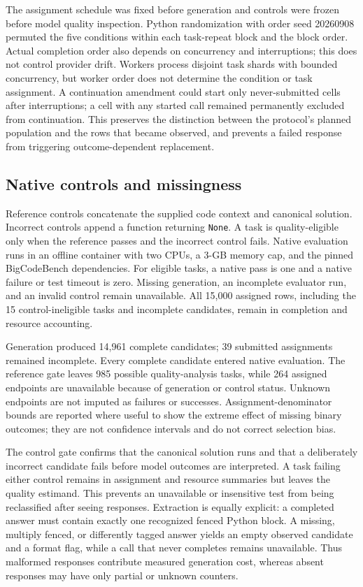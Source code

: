 The assignment schedule was fixed before generation and controls were frozen before model quality inspection. Python randomization with order seed 20260908 permuted the five conditions within each task-repeat block and the block order. Actual completion order also depends on concurrency and interruptions; this does not control provider drift. Workers process disjoint task shards with bounded concurrency, but worker order does not determine the condition or task assignment. A continuation amendment could start only never-submitted cells after interruptions; a cell with any started call remained permanently excluded from continuation. This preserves the distinction between the protocol's planned population and the rows that became observed, and prevents a failed response from triggering outcome-dependent replacement.

\subsection{Native controls and missingness}
Reference controls concatenate the supplied code context and canonical solution. Incorrect controls append a function returning \texttt{None}. A task is quality-eligible only when the reference passes and the incorrect control fails. Native evaluation runs in an offline container with two CPUs, a 3-GB memory cap, and the pinned BigCodeBench dependencies. For eligible tasks, a native pass is one and a native failure or test timeout is zero. Missing generation, an incomplete evaluator run, and an invalid control remain unavailable. All 15,000 assigned rows, including the 15 control-ineligible tasks and incomplete candidates, remain in completion and resource accounting.

Generation produced 14,961 complete candidates; 39 submitted assignments remained incomplete. Every complete candidate entered native evaluation. The reference gate leaves 985 possible quality-analysis tasks, while 264 assigned endpoints are unavailable because of generation or control status. Unknown endpoints are not imputed as failures or successes. Assignment-denominator bounds are reported where useful to show the extreme effect of missing binary outcomes; they are not confidence intervals and do not correct selection bias.

The control gate confirms that the canonical solution runs and that a deliberately incorrect candidate fails before model outcomes are interpreted. A task failing either control remains in assignment and resource summaries but leaves the quality estimand. This prevents an unavailable or insensitive test from being reclassified after seeing responses. Extraction is equally explicit: a completed answer must contain exactly one recognized fenced Python block. A missing, multiply fenced, or differently tagged answer yields an empty observed candidate and a format flag, while a call that never completes remains unavailable. Thus malformed responses contribute measured generation cost, whereas absent responses may have only partial or unknown counters.

